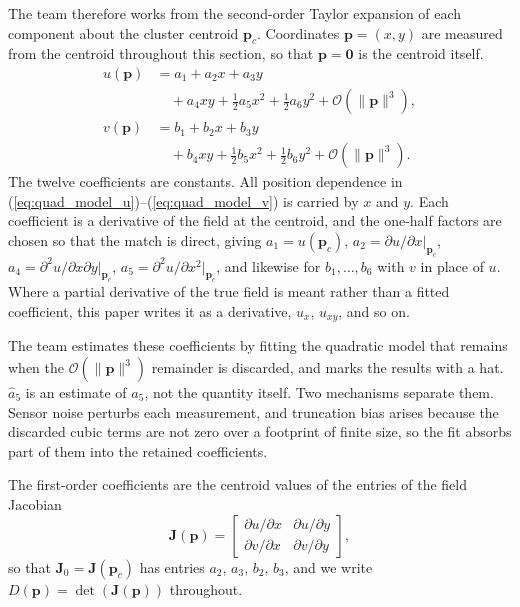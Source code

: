 \documentclass[lettersize,journal]{IEEEtran}
\begin{document}
The team therefore works from the second-order Taylor expansion of each
component about the cluster centroid $\mathbf{p}_c$. Coordinates
$\mathbf{p} = (x, y)$ are measured from the centroid throughout this
section, so that $\mathbf{p} = \mathbf{0}$ is the centroid itself.
\begin{align}
    u(\mathbf{p}) &= a_1 + a_2 x + a_3 y
        \nonumber \\
        &\quad + a_4 xy + \tfrac{1}{2} a_5 x^2 + \tfrac{1}{2} a_6 y^2
        + \mathcal{O}(\|\mathbf{p}\|^3),
        \label{eq:quad_model_u} \\
    v(\mathbf{p}) &= b_1 + b_2 x + b_3 y
        \nonumber \\
        &\quad + b_4 xy + \tfrac{1}{2} b_5 x^2 + \tfrac{1}{2} b_6 y^2
        + \mathcal{O}(\|\mathbf{p}\|^3).
        \label{eq:quad_model_v}
\end{align}
The twelve coefficients are constants. All position dependence in
(\ref{eq:quad_model_u})--(\ref{eq:quad_model_v}) is carried by $x$ and
$y$. Each coefficient is a derivative of the field at the centroid, and
the one-half factors are chosen so that the match is direct, giving
$a_1 = u(\mathbf{p}_c)$, $a_2 = \partial u/\partial x|_{\mathbf{p}_c}$,
$a_4 = \partial^2 u/\partial x \partial y|_{\mathbf{p}_c}$,
$a_5 = \partial^2 u/\partial x^2|_{\mathbf{p}_c}$, and likewise for
$b_1, \ldots, b_6$ with $v$ in place of $u$. Where a partial derivative
of the true field is meant rather than a fitted coefficient, this paper
writes it as a derivative, $u_x$, $u_{xy}$, and so on.

The team estimates these coefficients by fitting the quadratic model that
remains when the $\mathcal{O}(\|\mathbf{p}\|^3)$ remainder is discarded,
and marks the results with a hat. $\hat{a}_5$ is an estimate of $a_5$,
not the quantity itself. Two mechanisms separate them. Sensor
noise perturbs each measurement, and truncation bias arises because the
discarded cubic terms are not zero over a footprint of finite size, so the
fit absorbs part of them into the retained coefficients.

The first-order coefficients are the centroid values of the entries of the
field Jacobian
\begin{equation}
    \mathbf{J}(\mathbf{p}) =
    \begin{bmatrix}
        \partial u / \partial x & \partial u / \partial y \\
        \partial v / \partial x & \partial v / \partial y
    \end{bmatrix},
    \label{eq:jacobian}
\end{equation}
so that $\mathbf{J}_0 = \mathbf{J}(\mathbf{p}_c)$ has entries $a_2$,
$a_3$, $b_2$, $b_3$, and we write $D(\mathbf{p}) =
\det(\mathbf{J}(\mathbf{p}))$ throughout. 
\end{document}
